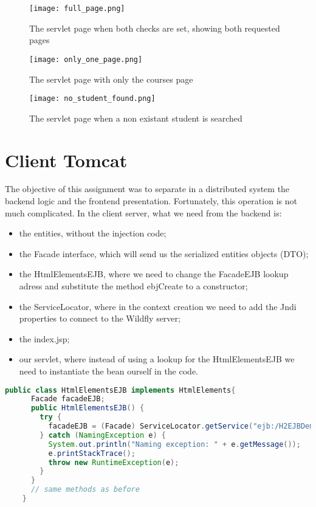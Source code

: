 \begin{figure}[H]
  \centering
  \texttt{[image: full\_page.png]}
  \caption{The servlet page when both checks are set, showing both requested pages}
\end{figure}

\begin{figure}[H]
  \centering
  \texttt{[image: only\_one\_page.png]}
  \caption{The servlet page with only the courses page}
\end{figure}

\begin{figure}[H]
  \centering
  \texttt{[image: no\_student\_found.png]}
  \caption{The servlet page when a non existant student is searched}
\end{figure}

\pagebreak
\section{Client Tomcat}
The objective of this assignment was to separate in a distributed system the backend logic and the frontend presentation. Fortunately, this operation is not much complicated.
In the client server, what we need from the backend is:
\begin{itemize}
  \item  the entities, without the injection code;
  \item  the Facade interface, which will send us the serialized entities objects (DTO);
  \item  the HtmlElementsEJB, where we need to change the FacadeEJB lookup adress and substitute the method ebjCreate to a constructor;
  \item  the ServiceLocator, where in the context creation we need to add the Jndi properties to connect to the Wildfly server;
  \item  the index.jsp;
  \item  our servlet, where instead of using a lookup for the HtmlElementsEJB we need to instantiate the bean ourself in the code.
\end{itemize}

\begin{lstlisting}[language=java, caption={The new HtmlElementsEJB}]
    public class HtmlElementsEJB implements HtmlElements{
      Facade facadeEJB;
      public HtmlElementsEJB() {
        try {
          facadeEJB = (Facade) ServiceLocator.getService("ejb:/H2EJBDemo-1.0-SNAPSHOT/FacadeEJB!it.marrocco.h2ejbdemo.ejb.Facade");
        } catch (NamingException e) {
          System.out.println("Naming exception: " + e.getMessage());
          e.printStackTrace();
          throw new RuntimeException(e);
        }
      }
      // same methods as before
    }
  \end{lstlisting}

